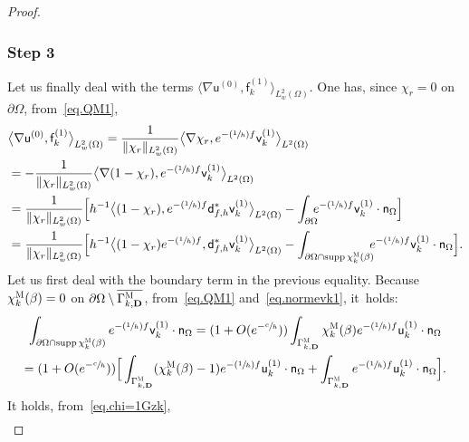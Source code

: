 \documentclass[10pt]{amsart}
\newcommand{\Psfrac}[2]{(\sfrac{#1}{#2})}
\newcommand{\mbf}[1]{\mathbf{#1}}
\let\lp\langle
\let\rp\rangle
\DeclareMathOperator\supp{supp}
\theoremstyle{plain}
\theoremstyle{definition}
\begin{document}
\begin{proof}
\subsubsection*{Step 3} Let us finally deal with the terms $
\big \lp \nabla\mathsf u^{(0)}, \mathsf f_k^{(1)}\big\rp_{L^2_w(\Omega)}$.
One has, since $\chi_r=0$ on $\partial \Omega$, from~\eqref{eq.QM1},
\begin{align*}
& \big \lp \nabla \mathsf u^{(0)}, \mathsf f_k^{(1)}\big\rp_{L^2_w(\Omega)}= \frac{1}{\Vert \chi_r\Vert_{L^2_w(\Omega)}} \big \lp \nabla \chi_r, e^{-\Psfrac 1hf} \mathsf v_k^{(1)}\big\rp_{L^2(\Omega)}\\
&=-\frac{1}{\Vert \chi_r\Vert_{L^2_w(\Omega)}} \big \lp \nabla(1- \chi_r), e^{-\Psfrac 1hf} \mathsf v_k^{(1)}\big\rp_{L^2(\Omega)}\\
&= \frac{1}{\Vert \chi_r\Vert_{L^2_w(\Omega)}} \Big[ h^{-1} \big \lp (1- \chi_r), e^{-\Psfrac 1hf}\mathsf d^*_{f,h} \mathsf v_k^{(1)}\big\rp_{L^2(\Omega)} -\int_{\partial \Omega}\hspace*{-2mm} e^{-\Psfrac 1hf} \mathsf v_k^{(1)} \cdot \mathsf n_\Omega \Big]\\
&= \frac{1}{\Vert \chi_r\Vert_{L^2_w(\Omega)}} \Big[ h^{-1} \big \lp (1- \chi_r) e^{-\Psfrac 1hf}, \mathsf d^*_{f,h} \mathsf v_k^{(1)}\big\rp_{L^2(\Omega)} -\int_{\partial \Omega \cap\supp \chi_k^{\textsc{M}} (\beta) }\hspace*{-2mm} e^{-\Psfrac 1hf} \mathsf v_k^{(1)} \cdot \mathsf n_\Omega \Big].
\end{align*}
Let us first deal with the boundary term in the previous equality.
Because $\chi_k^{\textsc{M}} (\beta)=\nobreak0$ on $\partial \Omega\setminus \overline{\Gamma_{k,\mbf D}^{ \textsc{M} }}$, from~\eqref{eq.QM1} and~\eqref{eq.normevk1}, it~holds:
\begin{multline*}
\int_{\partial \Omega \cap\supp \chi_k^{\textsc{M}} (\beta) } e^{-\Psfrac 1hf} \mathsf v_k^{(1)} \cdot \mathsf n_\Omega = (1+O(e^{-\sfrac ch}))\int_{ \Gamma_{k,\mbf D}^{ \textsc{M} }} \chi_k^{\textsc{M}} (\beta) e^{-\Psfrac 1hf} \mathsf u_k^{(1)} \cdot \mathsf n_\Omega \\
= (1+O(e^{-\sfrac ch}))\Big[ \int_{ \Gamma_{k,\mbf D}^{ \textsc{M} }} (\chi_k^{\textsc{M}} (\beta)-1) e^{-\Psfrac 1hf} \mathsf u_k^{(1)} \cdot \mathsf n_\Omega + \int_{ \Gamma_{k,\mbf D}^{ \textsc{M} }} e^{-\Psfrac 1hf} \mathsf u_k^{(1)} \cdot \mathsf n_\Omega\Big].
\end{multline*}
It holds, from~\eqref{eq.chi=1Gzk},
\[
\begin{aligned}

\end{aligned}\]
\end{proof}
\end{document}
